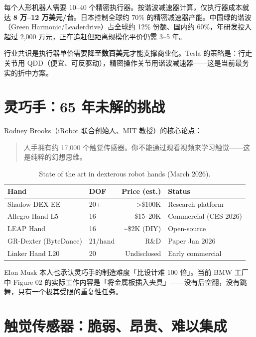 每个人形机器人需要 10--40 个精密执行器。按谐波减速器计算，仅执行器成本就达 \textbf{8 万--12 万美元/台}\cite{techticker2026harmonic}。日本控制全球约 70\% 的精密减速器产能。中国绿的谐波（Green Harmonic/Leaderdrive）占全球约 12\% 份额、国内约 60\%，年研发投入超过 2,000 万元，正在追赶但距离规模化平价仍需 3--5 年\cite{designnews2026supply}。

行业共识是执行器单价需要降至\textbf{数百美元}才能支撑商业化。Tesla 的策略是：行走关节用 QDD（便宜、可反驱动），精密操作关节用谐波减速器——这是当前最务实的折中方案。

\section{灵巧手：65 年未解的挑战}

Rodney Brooks（iRobot 联合创始人、MIT 教授）的核心论点\cite{brooks2025dexterity}：

\begin{quote}
人手拥有约 17,000 个触觉传感器。你不能通过观看视频来学习触觉——这是纯粹的幻想思维。
\end{quote}

\begin{table}[htbp]
\centering
\caption{State of the art in dexterous robot hands (March 2026).}
\label{tab:hands}
\begin{tabular}{llrl}
\toprule
\rowcolor{figLightGray}
\textbf{Hand} & \textbf{DOF} & \textbf{Price (est.)} & \textbf{Status} \\
\midrule
Shadow DEX-EE & 20+ & >\$100K & Research platform \\
Allegro Hand L5 & 16 & \$15--20K & Commercial (CES 2026) \\
LEAP Hand & 16 & \textasciitilde\$2K (DIY) & Open-source \\
GR-Dexter (ByteDance) & 21/hand & R\&D & Paper Jan 2026 \\
Linker Hand L20 & 20 & Undisclosed & Early commercial \\
\bottomrule
\end{tabular}
\end{table}

Elon Musk 本人也承认灵巧手的制造难度「比设计难 100 倍」\cite{musk2025hand}。当前 BMW 工厂中 Figure 02 的实际工作内容是「将金属板插入夹具」——没有后空翻，没有跳舞，只有一个极其受限的重复性任务\cite{figure2026bmw}。

\section{触觉传感器：脆弱、昂贵、难以集成}

